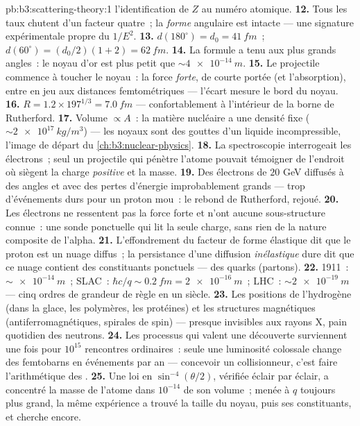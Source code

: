 \begin{solution}{pb:b3:scattering-theory:1}
l'identification de $Z$ au numéro atomique.
\textbf{12.} Tous les taux chutent d'un facteur quatre~; la
\emph{forme} angulaire est intacte --- une signature expérimentale
propre du $1/E^2$.
\textbf{13.} $d(180^\circ) = d_0 = \qty{41}{fm}$~; $d(60^\circ) =
(d_0/2)(1 + 2) = \qty{62}{fm}$.
\textbf{14.} La formule a tenu aux plus grands angles~: le noyau d'or
est plus petit que $\sim\qty{4e-14}{m}$.
\textbf{15.} Le projectile commence à toucher le noyau~: la force
\emph{forte}, de courte portée (et l'absorption), entre en jeu aux
distances femtométriques --- l'écart mesure le bord du noyau.
\textbf{16.} $R = 1.2 \times 197^{1/3} = \qty{7.0}{fm}$ ---
confortablement à l'intérieur de la borne de Rutherford.
\textbf{17.} Volume $\propto A$~: la matière nucléaire a une densité
fixe ($\sim\qty{2e17}{kg/m^3}$) --- les noyaux sont des gouttes d'un
liquide incompressible, l'image de départ du
\cref{ch:b3:nuclear-physics}.
\textbf{18.} La spectroscopie interrogeait les électrons~; seul un
projectile qui pénètre l'atome pouvait témoigner de l'endroit où
siègent la charge \emph{positive} et la masse.
\textbf{19.} Des électrons de $20$ GeV diffusés à des angles et avec
des pertes d'énergie improbablement grands --- trop d'événements durs
pour un proton mou~: le rebond de Rutherford, rejoué.
\textbf{20.} Les électrons ne ressentent pas la force forte et n'ont
aucune sous-structure connue~: une sonde ponctuelle qui lit la seule
charge, sans rien de la nature composite de l'alpha.
\textbf{21.} L'effondrement du facteur de forme élastique dit que le
proton est un nuage diffus~; la persistance d'une diffusion
\emph{inélastique} dure dit que ce nuage contient des constituants
ponctuels --- des quarks (partons).
\textbf{22.} 1911~: $\sim\qty{e-14}{m}$~; SLAC~: $\hbar c/q \sim
\qty{0.2}{fm} = \qty{2e-16}{m}$~; LHC~: $\sim\qty{2e-19}{m}$ ---
cinq ordres de grandeur de règle en un siècle.
\textbf{23.} Les positions de l'hydrogène (dans la glace, les
polymères, les protéines) et les structures magnétiques
(antiferromagnétiques, spirales de spin) --- presque invisibles aux
rayons X, pain quotidien des neutrons.
\textbf{24.} Les processus qui valent une découverte surviennent une
fois pour $10^{15}$ rencontres ordinaires~: seule une luminosité
colossale change des femtobarns en événements par an --- concevoir un
collisionneur, c'est faire l'arithmétique des .
\textbf{25.} Une loi en $\sin^{-4}(\theta/2)$, vérifiée éclair par
éclair, a concentré la masse de l'atome dans $10^{-14}$ de son
volume~; menée à $q$ toujours plus grand, la même expérience a trouvé
la taille du noyau, puis ses constituants, et cherche encore.
\end{solution}
